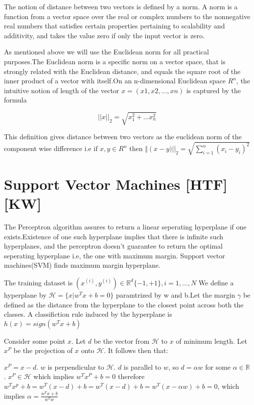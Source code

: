 \documentclass[12pt]{article}
\begin{document}
 The notion of distance between two vectors is defined by a norm. A norm is a function from a vector space over the real or complex numbers to the nonnegative real numbers that satisfies certain properties pertaining to scalability and additivity, and takes the value zero if only the input vector is zero.
 
 As mentioned above we will use the Euclidean norm for all practical purposes.The Euclidean norm  is a specific norm on a vector space, that is strongly related with the Euclidean distance, and equals the square root of the inner product of a vector with itself.On an n-dimensional Euclidean space $ R^{n}$, the intuitive notion of length of the vector $x = (x1, x2, ..., xn)$ is captured by the formula
 
 $$\vert \vert x \vert \vert _{2} = \sqrt{x_{1}^{2}+ \dots x_{n}^{2}}$$
 
 
This definition gives distance between two vectors as the euclidean norm of the component wise difference i.e if $x,y \in R^{n}$ then $ \Vert\left(x-y)\vert\right\vert_{2} = \sqrt{\sum\limits_{i=1}^{n}(x_{i}-y_{i})^{2}} $
 
 
 
 
 
 
 
 \section{Support Vector Machines \tiny{[HTF][KW]}} 
 
 The Perceptron algorithm assures to return a linear seperating hyperplane if one exists.Existence of one  such  hyperplane implies that there is infinite such hyperplanes, and the perceptron doesn't guarantee to return the optimal seperating hyperplane i.e, the one with maximum margin.
 Support vector machines(SVM) finds maximum margin hyperplane. 
 
 The training dataset is $(x^{(i)}, y^{(i)}) \in \mathbb{R}^{d} \{-1,+1\},i = 1,...,N$ We define a  hyperplane by $\mathcal{H}=\{x \vert w^{T}x + b =0\}$ paramtrized by w and b.Let the margin $\gamma$ be defined as the distance from the hyperplane to the closest point across both the classes. A classifiction rule induced by the hyperplane is $h(x) = sign(w^{T}x+ b)$
 
 
 Consider some point $x$. Let $d$ be the vector from $\mathcal{H}$ to $x$ of minimum length. Let $x^{P}$ be the projection of $x$ onto $\mathcal{H}$. It follows then that:
 
 $x^{P} = x - d.$
 $w$ is perpendicular to $\mathcal{H}$. $d$ is parallel to $w$,  so $d = \alpha w$ for some $\alpha \in \mathbb{R}$. $x^{P} \in \mathcal{H}$ which implies $w^{T}x^{P} + b =0$
 therefore\\  $w^{T}x^{p} + b = w^{T}(x-d) + b = w^{T}(x-d) + b = w^{T}(x-\alpha w) + b =0$, which implies $\alpha = \frac{w^{T}x + b}{w^{T}w}$
 
\end{document}
